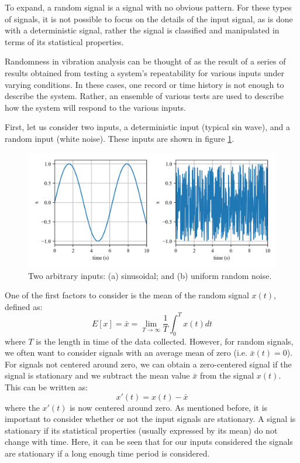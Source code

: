 \documentclass[12pt,letter]{article}
\begin{document}
To expand, a random signal is a signal with no obvious pattern. For these types of signals, it is not possible to focus on the details of the input signal, as is done with a deterministic signal, rather the signal is classified and manipulated in terms of its statistical properties. 

Randomness in vibration analysis can be thought of as the result of a series of results obtained from testing a system's repeatability for various inputs under varying conditions. In these cases, one record or time history is not enough to describe the system. Rather, an ensemble of various tests are used to describe how the system will respond to the various inputs. 

First, let us consider two inputs, a deterministic input (typical sin wave), and a random input (white noise). These inputs are shown in figure \ref{fig:Response_to_random_input_inputs}. 

\begin{figure}[H]
	\centering
	\includegraphics[width=6.5in]{../figures/Response_to_random_input_inputs}
	\caption{Two arbitrary inputs: (a) sinusoidal; and (b) uniform random noise.}
	\label{fig:Response_to_random_input_inputs}
\end{figure}

One of the first factors to consider is the mean of the random signal $x(t)$, defined as:
\begin{equation}
E[x] = \bar{x} = \lim\limits_{T \rightarrow \infty} \frac{1}{T} \int_{0}^{T}x(t)dt
\end{equation}
where $T$ is the length in time of the data collected. However, for random signals, we often want to consider signals with an average mean of zero (i.e. $\bar{x}(t)=0$). For signals not centered around zero, we can obtain a zero-centered signal if the signal is stationary and we subtract the mean value $\bar{x}$ from the signal $x(t)$. This can be written as:
\begin{equation}
x'(t) = x(t) - \bar{x}
\end{equation} 
where the $x'(t)$ is now centered around zero. As mentioned before, it is important to consider whether or not the input signals are stationary. A signal is stationary if its statistical properties (usually expressed by its mean) do not change with time. Here, it can be seen that for our inputs considered the signals are stationary if a long enough time period is considered. 
\end{document}
